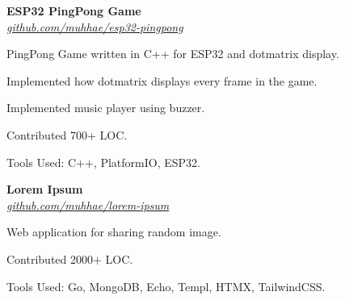     \begin{twocolentry}{
    }
    \textbf{ESP32 PingPong Game}\\
    \textit{\href{https://github.com/muhhae/esp32-pingpong}{github.com/muhhae/esp32-pingpong}}
    \end{twocolentry}

    \vspace{0.10 cm}
    \begin{onecolentry}
        \begin{highlights}
            \item PingPong Game written in C++ for ESP32 and dotmatrix display.
            \item Implemented how dotmatrix displays every frame in the game.
            \item Implemented music player using buzzer.
            \item Contributed 700+ LOC.
            \item Tools Used: C++, PlatformIO, ESP32.
        \end{highlights}
    \end{onecolentry}

    \vspace{0.2 cm}

    \begin{twocolentry}{
    }
    \textbf{Lorem Ipsum}\\
    \textit{\href{https://github.com/muhhae/lorem-ipsum}{github.com/muhhae/lorem-ipsum}}
    \end{twocolentry}

    \vspace{0.10 cm}
    \begin{onecolentry}
        \begin{highlights}
            \item Web application for sharing random image.
            \item Contributed 2000+ LOC.
            \item Tools Used: Go, MongoDB, Echo, Templ, HTMX, TailwindCSS.
        \end{highlights}
    \end{onecolentry}
